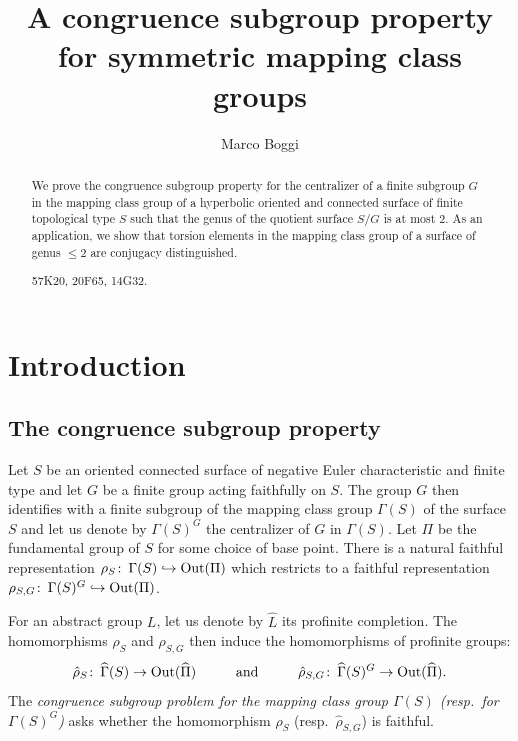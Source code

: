 \documentclass[12pt,twoside]{amsart}
\theoremstyle{definition}
\def\Out{\operatorname{Out}}
\def\hP{{\widehat\Pi}}
\def\G{{\Gamma}}
\def\hG{{\widehat\Gamma}}
\def\wh{\widehat}
\def\hookra{\hookrightarrow}
\def\co{\colon\thinspace}
\begin{document}
\title[A congruence subgroup property for symmetric mapping class groups]{A congruence subgroup property for symmetric mapping class groups}
 
\author{Marco Boggi}
\address{UFF - Instituto de Matem\'atica e Estat\'{\i}stica - Niter\'oi - RJ 24210-200; Brazil}


\begin{abstract}    
We prove the congruence subgroup property for the centralizer of a finite subgroup $G$ in the mapping class group of a hyperbolic oriented 
and connected surface of finite topological type $S$ such that the genus of the quotient surface $S/G$ is at most $2$. 
As an application, we show that torsion elements in the mapping class group of a surface of genus $\leq 2$ are conjugacy distinguished.
\bigskip

 57K20, 20F65, 14G32.

\end{abstract}

\maketitle


\section{Introduction}\label{Intro}
\subsection{The congruence subgroup property}
Let $S$ be an oriented connected surface of negative Euler characteristic and finite type and let $G$ be a finite group acting faithfully on $S$. 
The group $G$ then identifies with a finite subgroup of the mapping class group $\G(S)$ of the surface $S$ and let us denote by $\G(S)^G$ 
the centralizer of $G$ in $\G(S)$. Let $\Pi$ be the fundamental group of $S$ for some choice of base point. 
There is a natural faithful representation $\rho_S\co\G(S)\hookra\Out(\Pi)$ 
which restricts to a  faithful representation $\rho_{S,G}\co\G(S)^G\hookra\Out(\Pi)$. 

For an abstract group $L$, let us denote by $\wh{L}$ its profinite completion. The homomorphisms $\rho_S$ and $\rho_{S,G}$ then induce the
homomorphisms of profinite groups:
\begin{equation}\label{proGrepr}
\hat\rho_S\co\hG(S)\to\Out(\hP)\hspace{1cm}\mbox{and}\hspace{1cm}\hat\rho_{S,G}\co\hG(S)^G\to\Out(\hP).
\end{equation}
The \emph{congruence subgroup problem for the mapping class group $\G(S)$ (resp.\ for $\G(S)^G$)} 
asks whether the homomorphism $\hat\rho_S$ (resp.\ $\hat\rho_{S,G}$) is faithful. 
\end{document}
